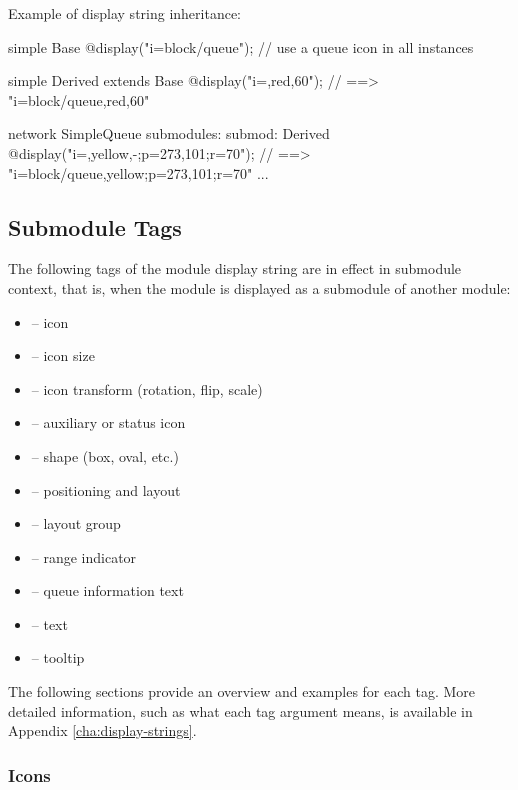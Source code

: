 Example of display string inheritance:

\begin{ned}
simple Base {
    @display("i=block/queue"); // use a queue icon in all instances
}

simple Derived extends Base {
    @display("i=,red,60");  // ==> "i=block/queue,red,60"
}

network SimpleQueue {
    submodules:
        submod: Derived {
            @display("i=,yellow,-;p=273,101;r=70");
                     // ==> "i=block/queue,yellow;p=273,101;r=70"
        }
        ...
}
\end{ned}


\subsection{Submodule Tags}
\label{sec:graphics:submodule-displaystring-tags}

The following tags of the module display string are in effect in submodule
context, that is, when the module is displayed as a submodule of another
module:

\begin{itemize}
  \item {} -- icon
  \item {} -- icon size
  \item {} -- icon transform (rotation, flip, scale)
  \item {} -- auxiliary or status icon
  \item {} -- shape (box, oval, etc.)
  \item {} -- positioning and layout
  \item {} -- layout group
  \item {} -- range indicator
  \item {} -- queue information text
  \item {} -- text
  \item {} -- tooltip
\end{itemize}

The following sections provide an overview and examples for each tag. More
detailed information, such as what each tag argument means, is available in
Appendix \ref{cha:display-strings}.

\subsubsection{Icons}
\label{sec:graphics:submodule-icons}


